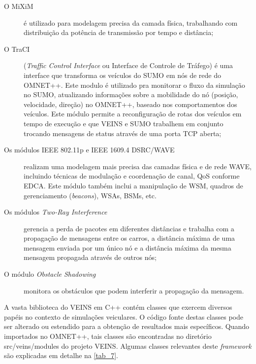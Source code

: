 \documentclass[
12pt,				%
openright,			%
oneside,			%
a4paper,			%
brazil,				%
]{abntex2}
\begin{document}
	\begin{description}
		\item[O MiXiM] é utilizado para modelagem precisa da camada física, trabalhando com distribuição da potência de transmissão por tempo e distância;
		\item[O TraCI] (\textit{Traffic Control Interface} ou Interface de Controle de Tráfego) é uma interface que transforma os veículos do SUMO em nós de rede do OMNET++. Este modulo é utilizado pra monitorar o fluxo da simulação no SUMO, atualizando informações sobre a mobilidade do nó (posição, velocidade, direção) no OMNET++, baseado nos comportamentos dos veículos. Este módulo permite a reconfiguração de rotas dos veículos em tempo de execução e que VEINS e SUMO trabalhem em conjunto trocando mensagens de status através de uma porta TCP aberta;
		\item[Os módulos IEEE 802.11p e IEEE 1609.4 DSRC/WAVE] realizam uma modelagem mais precisa das camadas física e de rede WAVE, incluindo técnicas de modulação e coordenação de canal, QoS conforme EDCA. Este módulo também inclui a manipulação de WSM, quadros de gerenciamento (\textit{beacons}), WSAs, BSMs, etc.
		\item[Os módulos \textit{Two-Ray Interference}] gerencia a perda de pacotes em diferentes distâncias e trabalha com a propagação de mensagens entre os carros, a distância máxima de uma mensagem enviada por um único nó e a distância máxima da mesma mensagem propagada através de outros nós;
		\item[O módulo \textit{Obstacle Shadowing}] monitora os obstáculos que podem interferir a propagação da mensagem.
	\end{description}
	
	\par A vasta biblioteca do VEINS em C++ contém classes que exercem diversos papéis no contexto de simulações veiculares. O código fonte destas classes pode ser alterado ou estendido para a obtenção de resultados mais específicos. Quando importados no OMNET++, tais classes são encontradas no diretório src/veins/modules do projeto VEINS. Algumas classes relevantes deste \textit{framework} são explicadas em detalhe na \autoref{tab_7}. 
	
\end{document}
